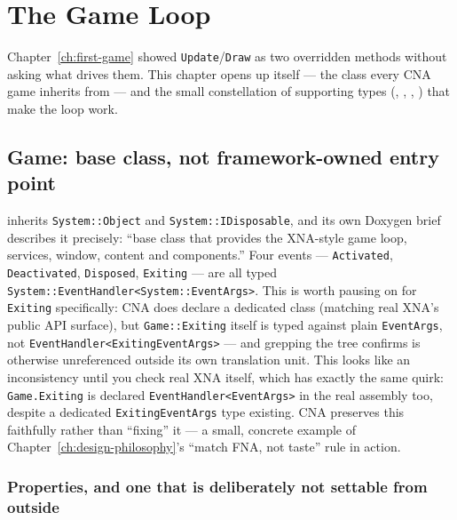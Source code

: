 \chapter{The Game Loop}
\label{ch:game-loop}

Chapter~\ref{ch:first-game} showed \texttt{Update}/\texttt{Draw} as two overridden methods
without asking what drives them. This chapter opens up  itself --- the class
every CNA game inherits from --- and the small constellation of supporting types
(, , ,
) that make the loop work.

\section{Game: base class, not framework-owned entry point}

 inherits \texttt{System::Object} and \texttt{System::IDisposable}, and its
own Doxygen brief describes it precisely: ``base class that provides the XNA-style game
loop, services, window, content and components.'' Four events --- \texttt{Activated},
\texttt{Deactivated}, \texttt{Disposed}, \texttt{Exiting} --- are all typed
\texttt{System::EventHandler<System::EventArgs>}. This is worth pausing on for
\texttt{Exiting} specifically: CNA does declare a dedicated  class
(matching real XNA's public API surface), but \texttt{Game::Exiting} itself is typed against
plain \texttt{EventArgs}, not \texttt{EventHandler<ExitingEventArgs>} --- and grepping the
tree confirms  is otherwise unreferenced outside its own
translation unit. This looks like an inconsistency until you check real XNA itself, which
has exactly the same quirk: \texttt{Game.Exiting} is declared \texttt{EventHandler<EventArgs>}
in the real assembly too, despite a dedicated \texttt{ExitingEventArgs} type existing.
CNA preserves this faithfully rather than ``fixing'' it --- a small, concrete example of
Chapter~\ref{ch:design-philosophy}'s ``match FNA, not taste'' rule in action.

\subsection{Properties, and one that is deliberately not settable from outside}

